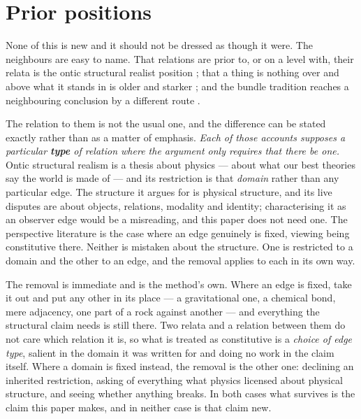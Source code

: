 \documentclass[11pt,a4paper]{article}
\begin{document}
\section{Prior positions}\label{sec:prior}
None of this is new and it should not be dressed as though it were. The neighbours are easy to name.
That relations are prior to, or on a level with, their relata is the ontic structural realist position
\citep{ladymanross2007,esfeld2004}; that a thing is nothing over and above what it stands in is older
and starker \citep{nagarjuna1995}; and the bundle tradition reaches a neighbouring conclusion by a
different route \citep{dcwilliams1953}.

The relation to them is not the usual one, and the difference can be stated exactly rather than as a
matter of emphasis. \emph{Each of those accounts supposes a particular \textbf{type} of relation where
the argument only requires that there be one.} Ontic structural realism is a thesis about physics --- about what our best theories say the world is
made of --- and its restriction is that \emph{domain} rather than any particular edge. The structure it
argues for is physical structure, and its live disputes are about objects, relations, modality and
identity; characterising it as an observer edge would be a misreading, and this paper does not need
one. The perspective literature is the case where an edge genuinely is fixed, viewing being
constitutive there. Neither is mistaken about the structure. One is restricted to a domain and the
other to an edge, and the removal applies to each in its own way.

The removal is immediate and is the method's own. Where an edge is fixed, take it out and put any
other in its place --- a gravitational one, a chemical bond, mere adjacency, one part of a rock against
another --- and everything the structural claim needs is still there. Two relata and a relation between
them do not care which relation it is, so what is treated as constitutive is a \emph{choice of edge
type}, salient in the domain it was written for and doing no work in the claim itself. Where a domain
is fixed instead, the removal is the other one: declining an inherited restriction, asking of
everything what physics licensed about physical structure, and seeing whether anything breaks. In both
cases what survives is the claim this paper makes, and in neither case is that claim new.
\end{document}
